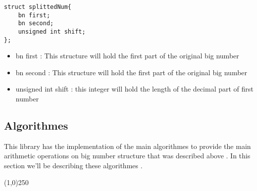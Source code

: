  

\begin{lstlisting}[style=CStyle]
struct splittedNum{
	bn first;
	bn second;
	unsigned int shift;
};
\end{lstlisting}

\begin{itemize}
	\item bn first : This structure will hold the first part of the original big number 
	\item bn second : This structure will hold the first part of the original big number
	\item unsigned int shift : this integer will hold the length of the decimal part of first number
\end{itemize}



\subsection{Algorithmes}
This library has the implementation of the main algorithmes to provide the main arithmetic operations on big number structure that was described above . In this section we'll be describing these algorithmes .




\newpage
\begin{center}
	\line(1,0){250}
\end{center}


